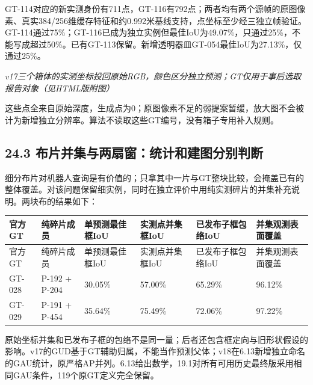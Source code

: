 \documentclass[UTF8,fontset=fandol]{ctexart}
\begin{document}
GT-114对应的新实测身份有711点，GT-116有792点；两者均有两个源帧的原图像素、真实384/256维缓存特征和约0.992米基线支持，点坐标至少经三独立帧验证。GT-114通过75\%；GT-116已成为独立实例但最佳IoU为49.07\%，只通过25\%，不能写成超过50\%。已有GT-113保留。新增透明器皿GT-054最佳IoU为27.13\%，仅通过25\%。



\textit{v17三个箱体的实测坐标投回原始RGB，颜色区分独立预测；GT仅用于事后选取报告对象（见HTML版附图）}



这些点全来自原始深度，生成点为0；原图像素不足的弱提案暂缓，放大图不会被计为新增独立分辨率。算法不读取这些GT编号，没有箱子专用补入规则。



\subsection*{24.3 布片并集与两扇窗：统计和建图分别判断}

细分布片对机器人查询是有价值的；只拿其中一片与GT整块比较，会掩盖已有的整体覆盖。对该问题保留细实例，同时在独立评价中用纯实测碎片的并集补充说明。两块布的结果如下：



{\small
\begin{longtable}{|p{}|p{}|p{}|p{}|p{}|p{}|}
\hline
官方GT & 纯碎片成员 & 单预测最佳框IoU & 实测点并集框IoU & 已发布子框包络IoU & 并集观测表面覆盖 \\ \hline
\endfirsthead
\hline
官方GT & 纯碎片成员 & 单预测最佳框IoU & 实测点并集框IoU & 已发布子框包络IoU & 并集观测表面覆盖 \\ \hline
\endhead
GT-028 & P-192 + P-204 & 30.05\% & 57.00\% & 65.29\% & 96.12\% \\ \hline
GT-029 & P-191 + P-454 & 35.64\% & 75.49\% & 72.06\% & 97.22\% \\ \hline
\end{longtable}
}

原始坐标并集和已发布子框的包络不是同一量；后者还包含框定向与旧形状假设的影响。v17的GUD基于GT辅助归属，不能当作预测父体；v18在6.13新增独立命名的GAU统计，原严格AP并列。6.13给出数学，19.1对所有可用历史最终版采用相同GAU条件，119个原GT定义完全保留。
\end{document}
